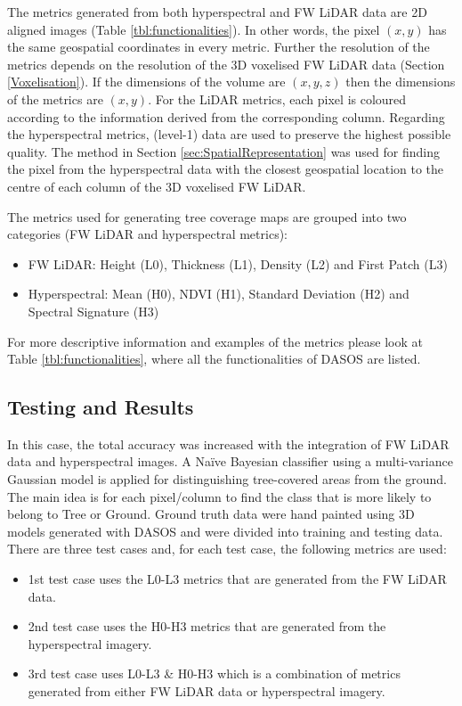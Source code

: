 \documentclass{subfiles}
\begin{document}
\par The metrics generated from both hyperspectral and FW LiDAR data are 2D aligned images (Table \ref{tbl:functionalities}). In other words, the pixel $(x, y)$ has the same geospatial coordinates in every metric. Further the resolution of the metrics depends on the resolution of the 3D voxelised FW LiDAR data (Section \ref{Voxelisation}). If the dimensions of the volume are $(x, y, z)$ then the dimensions of the metrics are $(x, y)$. For the LiDAR metrics, each pixel is coloured according to the information derived from the corresponding column. Regarding the hyperspectral metrics, (level-1) data are used to preserve the highest possible quality. The method in Section \ref{sec:SpatialRepresentation} was used for finding the pixel from the hyperspectral data with the closest geospatial location to the centre of each column of the 3D voxelised FW LiDAR.

\par The metrics used for generating tree coverage maps are grouped into two categories (FW LiDAR and hyperspectral metrics):
\begin{itemize}
	\item FW LiDAR: Height (L0), Thickness (L1), Density (L2) and First Patch (L3)
	\item Hyperspectral: Mean (H0), NDVI (H1), Standard Deviation (H2) and Spectral Signature (H3)
\end{itemize}
For more descriptive information and examples of the metrics please look at Table \ref{tbl:functionalities}, where all the functionalities of DASOS are listed.  


\subsection{Testing and Results}

\par In this case, the total accuracy was increased with the integration of FW LiDAR data and hyperspectral images. A Naïve Bayesian classifier using a multi-variance Gaussian model is applied for distinguishing tree-covered areas from the ground. The main idea is for each pixel/column to find the class that is more likely to belong to Tree or Ground.  Ground truth data were hand painted using 3D models generated with DASOS and were divided into training and testing data.  There are three test cases and, for each test case, the following metrics are used:

\begin{itemize}
	\item 1st test case uses the L0-L3 metrics that are generated from the FW LiDAR data.
	\item 2nd test case uses the H0-H3 metrics that are generated from the hyperspectral imagery.
	\item 3rd test case uses L0-L3 \& H0-H3 which is a combination of metrics generated from either FW LiDAR data or hyperspectral imagery. 
\end{itemize}
\end{document}
